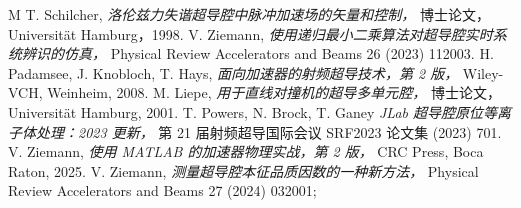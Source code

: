 \documentclass[12pt]{article}
\begin{document}
\begin{thebibliography}{M}
  T. Schilcher, {\em 洛伦兹力失谐超导腔中脉冲加速场的矢量和控制，} 博士论文，Universit\"at Hamburg，1998.
  V. Ziemann, {\em 使用递归最小二乘算法对超导腔实时系统辨识的仿真，} Physical Review Accelerators and Beams 26 (2023)
  112003.
  H. Padamsee, J. Knobloch, T. Hays, {\em 面向加速器的射频超导技术，第 2 版，}
  Wiley-VCH, Weinheim, 2008.
  M. Liepe, {\em 用于直线对撞机的超导多单元腔，} 博士论文，
  Universit\"at Hamburg, 2001.
  T. Powers, N. Brock, T. Ganey {\em JLab 超导腔原位等离子体处理：2023 更新，} 第 21 届射频超导国际会议 SRF2023 论文集 (2023) 701.
  V. Ziemann, {\em 使用 MATLAB 的加速器物理实战，第 2 版，}
  CRC Press, Boca Raton, 2025.
  V. Ziemann, {\em 测量超导腔本征品质因数的一种新方法，}
  Physical Review Accelerators and Beams 27 (2024) 032001;
%
\end{thebibliography}
%
\end{document}
